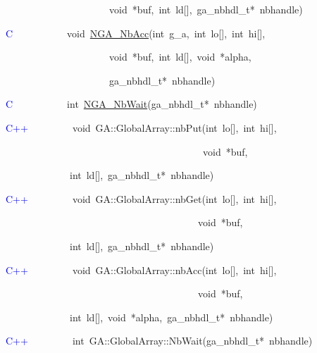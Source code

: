 \begin{lyxcode}
~~~~~~~~~~~~~~~~~~~~~void~{*}buf,~int~ld{[}{]},~ga\_nbhdl\_t{*}~nbhandle)~

\textcolor{blue}{C}~~~~~~~~~~~void~\href{http://www.emsl.pnl.gov/docs/global/c_nga_ops.html\#ga_nbacc}{NGA\_{}NbAcc}(int~g\_a,~int~lo{[}{]},~int~hi{[}{]},~

~~~~~~~~~~~~~~~~~~~~~void~{*}buf,~int~ld{[}{]},~void~{*}alpha,~

~~~~~~~~~~~~~~~~~~~~~ga\_nbhdl\_t{*}~nbhandle)~

\textcolor{blue}{C}~~~~~~~~~~~int~\href{http://www.emsl.pnl.gov/docs/global/c_nga_ops.html\#ga_nbwait}{NGA\_{}NbWait}(ga\_nbhdl\_t{*}~nbhandle)

\textcolor{blue}{C++}~~~~~~~~~void~GA::GlobalArray::nbPut(int~lo{[}{]},~int~hi{[}{]},~

~~~~~~~~~~~~~~~~~~~~~~~~~~~~~~~~~~~~~~~~void~{*}buf,~

~~~~~~~~~~~~~int~ld{[}{]},~ga\_nbhdl\_t{*}~nbhandle)~

\textcolor{blue}{C++}~~~~~~~~~void~GA::GlobalArray::nbGet(int~lo{[}{]},~int~hi{[}{]},~

~~~~~~~~~~~~~~~~~~~~~~~~~~~~~~~~~~~~~~~void~{*}buf,~

~~~~~~~~~~~~~int~ld{[}{]},~ga\_nbhdl\_t{*}~nbhandle)~

\textcolor{blue}{C++}~~~~~~~~~void~GA::GlobalArray::nbAcc(int~lo{[}{]},~int~hi{[}{]},~

~~~~~~~~~~~~~~~~~~~~~~~~~~~~~~~~~~~~~~~void~{*}buf,~

~~~~~~~~~~~~~int~ld{[}{]},~void~{*}alpha,~ga\_nbhdl\_t{*}~nbhandle)~

\textcolor{blue}{C++}~~~~~~~~~int~GA::GlobalArray::NbWait(ga\_nbhdl\_t{*}~nbhandle)
\end{lyxcode}


